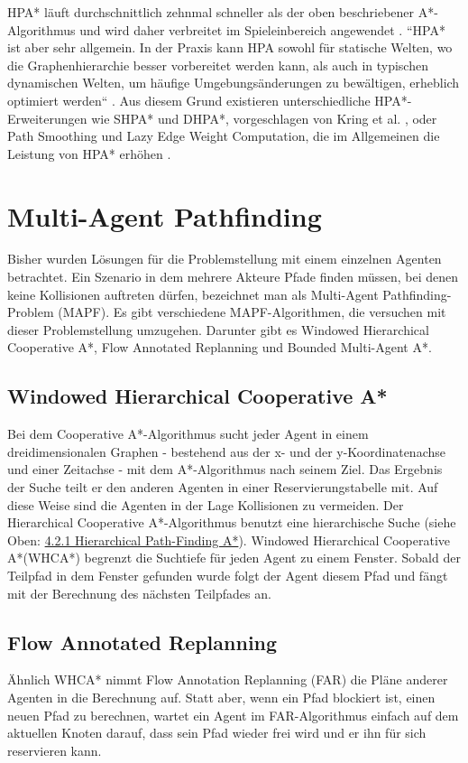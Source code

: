 \begin{sloppypar}
HPA* läuft durchschnittlich zehnmal schneller als der oben beschriebener A*-Algorithmus \cite{Bot04} und wird daher verbreitet im Spieleinbereich angewendet \cite{LSC08}. ``HPA* ist aber sehr allgemein. In der Praxis kann HPA sowohl für statische Welten, wo die Graphenhierarchie besser vorbereitet werden kann, als auch in typischen dynamischen Welten, um häufige Umgebungsänderungen zu bewältigen, erheblich optimiert werden`` \cite{Kri10}. Aus diesem Grund existieren unterschiedliche HPA*-Erweiterungen wie SHPA* und DHPA*, vorgeschlagen von Kring et al. \cite{Kri10}, oder Path Smoothing und Lazy Edge Weight Computation, die im Allgemeinen die Leistung von HPA* erhöhen \cite{JB07}.
\end{sloppypar}



\section{Multi-Agent Pathfinding}
Bisher wurden Lösungen für die Problemstellung mit einem einzelnen Agenten betrachtet. Ein Szenario in dem mehrere Akteure Pfade finden müssen, bei denen keine Kollisionen auftreten dürfen, bezeichnet man als Multi-Agent Pathfinding-Problem (MAPF). Es gibt verschiedene MAPF-Algorithmen, die versuchen mit dieser Problemstellung umzugehen. Darunter gibt es Windowed Hierarchical Cooperative A*, Flow Annotated Replanning und Bounded Multi-Agent A*.

\subsection{Windowed Hierarchical Cooperative A*}
Bei dem Cooperative A*-Algorithmus sucht jeder Agent in einem dreidimensionalen Graphen - bestehend aus der x- und der y-Koordinatenachse und einer Zeitachse - mit dem A*-Algorithmus nach seinem Ziel. 
Das Ergebnis der Suche teilt er den anderen Agenten in einer Reservierungstabelle mit. Auf diese Weise sind die Agenten in der Lage Kollisionen zu vermeiden. 
Der Hierarchical Cooperative A*-Algorithmus benutzt eine hierarchische Suche (siehe Oben: \hyperref[sec:hpa]{4.2.1 Hierarchical Path-Finding A*}). Windowed Hierarchical Cooperative A*(WHCA*) begrenzt die Suchtiefe für jeden Agent zu einem Fenster. Sobald der Teilpfad in dem Fenster gefunden wurde folgt der Agent diesem Pfad und fängt mit der Berechnung des nächsten Teilpfades an.
\subsection{Flow Annotated Replanning}
Ähnlich WHCA* nimmt Flow Annotation Replanning (FAR) die Pläne anderer Agenten in die Berechnung auf. Statt aber, wenn ein Pfad blockiert ist, einen neuen Pfad zu berechnen, wartet ein Agent im FAR-Algorithmus einfach auf dem aktuellen Knoten darauf, dass sein Pfad wieder frei wird und er ihn für sich reservieren kann.

